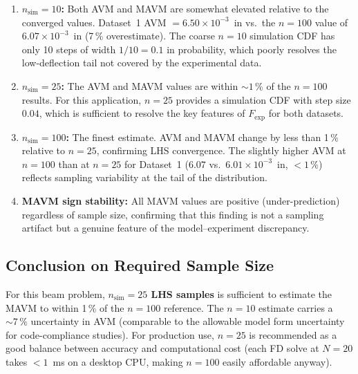 \documentclass[11pt,letterpaper]{article}
\newcommand{\Fexp}{F_{\mathrm{exp}}}
\begin{document}
\begin{enumerate}
  \item \textbf{$n_{\mathrm{sim}} = 10$:}  Both AVM and MAVM are somewhat elevated
        relative to the converged values.  Dataset~1 AVM $= 6.50\times10^{-3}$~in
        vs.\ the $n=100$ value of $6.07\times10^{-3}$~in (7\,\% overestimate).
        The coarse $n=10$ simulation CDF has only 10 steps of width $1/10 = 0.1$
        in probability, which poorly resolves the low-deflection tail not covered
        by the experimental data.

  \item \textbf{$n_{\mathrm{sim}} = 25$:}  The AVM and MAVM values are within
        $\sim\!1\,\%$ of the $n=100$ results.  For this application, $n=25$ provides
        a simulation CDF with step size $0.04$, which is sufficient to resolve the
        key features of $\Fexp$ for both datasets.

  \item \textbf{$n_{\mathrm{sim}} = 100$:}  The finest estimate.  AVM and MAVM change
        by less than 1\,\% relative to $n=25$, confirming LHS convergence.
        The slightly higher AVM at $n=100$ than at $n=25$ for Dataset~1
        ($6.07$ vs.\ $6.01 \times10^{-3}$~in, $< 1\,\%$) reflects sampling variability
        at the tail of the distribution.

  \item \textbf{MAVM sign stability:}  All MAVM values are positive (under-prediction)
        regardless of sample size, confirming that this finding is not a sampling
        artifact but a genuine feature of the model--experiment discrepancy.
\end{enumerate}

\subsection*{Conclusion on Required Sample Size}

For this beam problem, \textbf{$n_{\mathrm{sim}} = 25$ LHS samples} is sufficient
to estimate the MAVM to within 1\,\% of the $n=100$ reference.  The $n=10$ estimate
carries a $\sim\!7\,\%$ uncertainty in AVM (comparable to the allowable model form
uncertainty for code-compliance studies).  For production use, $n = 25$ is recommended
as a good balance between accuracy and computational cost (each FD solve at $N=20$
takes $<\!1$~ms on a desktop CPU, making $n = 100$ easily affordable anyway).

\end{document}
